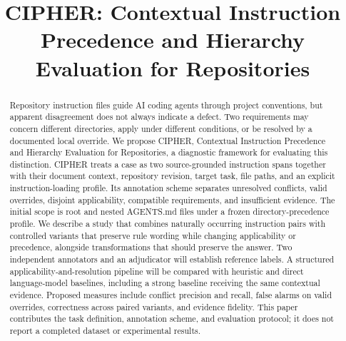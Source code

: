 \documentclass[10pt,conference]{IEEEtran}
\begin{document}
\title{CIPHER: Contextual Instruction Precedence and Hierarchy Evaluation for Repositories}
\author{
\and
{}
\and
{}}
\maketitle

\begin{abstract}
Repository instruction files guide AI coding agents through project conventions, but apparent disagreement does not always indicate a defect. Two requirements may concern different directories, apply under different conditions, or be resolved by a documented local override. We propose CIPHER, Contextual Instruction Precedence and Hierarchy Evaluation for Repositories, a diagnostic framework for evaluating this distinction. CIPHER treats a case as two source-grounded instruction spans together with their document context, repository revision, target task, file paths, and an explicit instruction-loading profile. Its annotation scheme separates unresolved conflicts, valid overrides, disjoint applicability, compatible requirements, and insufficient evidence. The initial scope is root and nested AGENTS.md files under a frozen directory-precedence profile. We describe a study that combines naturally occurring instruction pairs with controlled variants that preserve rule wording while changing applicability or precedence, alongside transformations that should preserve the answer. Two independent annotators and an adjudicator will establish reference labels. A structured applicability-and-resolution pipeline will be compared with heuristic and direct language-model baselines, including a strong baseline receiving the same contextual evidence. Proposed measures include conflict precision and recall, false alarms on valid overrides, correctness across paired variants, and evidence fidelity. This paper contributes the task definition, annotation scheme, and evaluation protocol; it does not report a completed dataset or experimental results.
\end{abstract}
\end{document}

